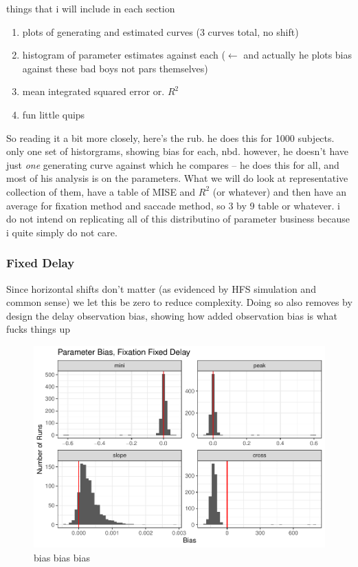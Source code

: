 \documentclass{article}
\begin{document}
things that i will include in each section

\begin{singlespace}
\begin{enumerate}
\vspace{-3mm}
\item plots of generating and estimated curves (3 curves total, no shift)
\item histogram of parameter estimates against each ($\leftarrow$ and actually he plots bias against these bad boys not pars themselves)
\item mean integrated squared error or. $R^2$
\item fun little quips
\end{enumerate}
\end{singlespace}

So reading it a bit more closely, here's the rub. he does this for 1000 subjects. only one set of historgrams, showing bias for each, nbd. however, he doesn't have just \textit{one} generating curve against which he compares -- he does this for all, and most of his analysis is on the parameters. What we will do look at representative collection of them, have a table of MISE and $R^2$ (or whatever) and then have an average for fixation method and saccade method,  so 3 by 9 table or whatever. i do not intend on replicating all of this distributino of parameter business because i quite simply do not care.

\subsubsection{Fixed Delay}

Since horizontal shifts don't matter (as evidenced by HFS simulation and common sense) we let this be zero to reduce complexity. Doing so also removes by design the delay observation bias, showing how added observation bias is what fucks things up


\begin{figure}[h]
\centering
\includegraphics{fixation_fixed_par_bias.pdf}
\caption{bias bias bias}
\label{fig:fixation_fixed_par_bias}
\end{figure}
\end{document}
